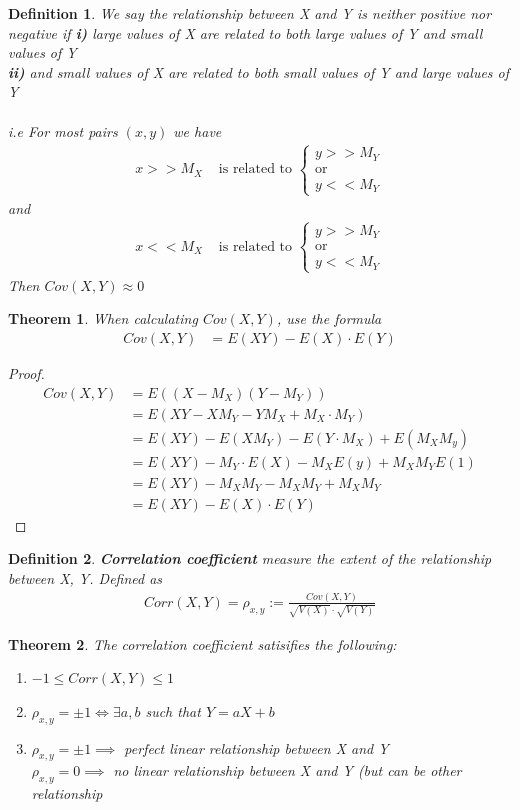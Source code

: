 \documentclass[11pt,oneside]{book}
\theoremstyle{break}
\theoremstyle{break}
\newtheorem{thm}{Theorem}[section]
\newtheorem{defn}{Definition}[corL]
\begin{document}
\begin{defn}
We say the relationship between X and Y is neither positive nor negative if \textbf{i)} large values of X are related to both large values of Y and small values of Y\\
\textbf{ii)} and small values of X are related to both small values of Y and large values of Y\\
\hfill\\
i.e For most pairs $(x,y)$ we have \begin{align*}
x>>M_X &\text{ is related to } \begin{cases}
y>>M_Y\\
\text{or}\\
y<<M_Y
\end{cases}
\end{align*}
and \begin{align*}
x<<M_X &\text{ is related to } \begin{cases}
y>>M_Y\\
\text{or}\\
y<<M_Y
\end{cases}
\end{align*}
Then $Cov(X,Y)\approx 0$ 
\end{defn}
\begin{thm}
When calculating $Cov(X,Y)$, use the formula \begin{align*}
Cov(X,Y)&=E(XY)-E(X)\cdot E(Y)
\end{align*}
\end{thm}
\begin{proof}
\begin{align*}
Cov(X,Y)&=E((X-M_X)(Y-M_Y))\\
&=E(XY-XM_Y-YM_X+M_X\cdot M_Y)\\
&=E(XY)-E(XM_Y)-E(Y\cdot M_X)+E(M_XM_y)\\
&=E(XY)-M_Y\cdot E(X)-M_XE(y)+M_XM_YE(1)\\
&=E(XY)-M_XM_Y-M_XM_Y+M_XM_Y\\
&=E(XY)-E(X)\cdot E(Y)
\end{align*}
\end{proof}
\begin{defn}
\textbf{Correlation coefficient} measure the extent of the relationship between X, Y. Defined as \begin{align*}
Corr(X,Y)=\rho_{x,y}:=\frac{Cov(X,Y)}{\sqrt{V(X)}\cdot \sqrt{V(Y)}}
\end{align*}
\end{defn}
\begin{thm}
The correlation coefficient satisifies the following:\begin{enumerate}
\item $-1\leq Corr(X,Y)\leq 1$
\item $\rho_{x,y}=\pm 1\iff \exists a,b$ such that $Y=aX+b$
\item $\rho_{x,y}=\pm 1 \implies$ perfect linear relationship between X and Y\\
$\rho_{x,y}=0\implies$ no linear relationship between X and Y (but can be other relationship
\end{enumerate}
\end{thm}
\end{document}
